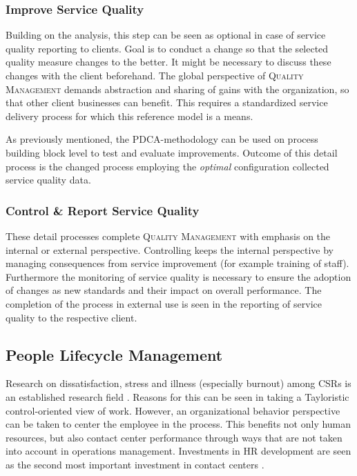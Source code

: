 	\subsubsection{Improve Service Quality}
	Building on the analysis, this step can be seen as optional in case of service quality reporting to clients. Goal is to conduct a change so that the selected quality measure changes to the better. It might be necessary to discuss these changes with the client beforehand. The global perspective of \textsc{Quality Management} demands abstraction and sharing of gains with the organization, so that other client businesses can benefit. This requires a standardized service delivery process for which this reference model is a means. 
	
	As previously mentioned, the \acrshort{PDCA}-methodology can be used on process building block level to test and evaluate improvements. Outcome of this detail process is the changed process employing the \textit{optimal} configuration \wrt collected service quality data.  
	
	\subsubsection{Control \& Report Service Quality}
	These detail processes complete \textsc{Quality Management} with emphasis on the internal or external perspective. 
	Controlling keeps the internal perspective by managing consequences from service improvement (for example training of staff). Furthermore the monitoring of service quality is necessary to ensure the adoption of changes as new standards and their impact on overall performance.  
	The completion of the process in external use is seen in the reporting of service quality to the respective client. 
	
	\subsection{People Lifecycle Management}
	\label{sec:plmang}
	Research on dissatisfaction, stress and illness (especially burnout) among \acrshort{CSR}s is an established research field \citep[]{Aksin_2009}. Reasons for this can be seen in taking a Tayloristic control-oriented view of work. However, an organizational behavior perspective can be taken to center the employee in the process. This benefits not only human resources, but also contact center performance through ways that are not taken into account in operations management. Investments in HR development are seen as the second most important investment in contact centers \citep{ccnet2016}.
	
